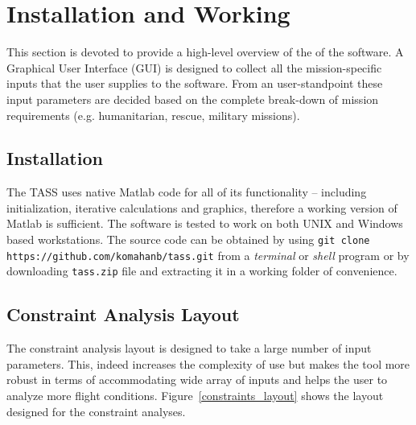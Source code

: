 \documentclass[pdftex,11pt,letter]{article}
\begin{document}
\section{Installation and Working }\label{layout}
This section is devoted to provide a high-level overview of the of the software. A Graphical User Interface (GUI) is designed to collect all the mission-specific inputs that the user supplies to the software. From an user-standpoint these input parameters are decided based on the complete break-down of mission requirements (e.g. humanitarian, rescue, military missions). 

\subsection{Installation}
The TASS uses native Matlab code for all of its functionality -- including initialization, iterative calculations and graphics, therefore a working version of Matlab\cite{MATLAB} is sufficient. The software is tested to work on both UNIX and Windows based workstations. The source code can be obtained by using \texttt{git clone https://github.com/komahanb/tass.git} from a \textit{terminal} or \textit{shell} program or by downloading \texttt{tass.zip} file and extracting it in a working folder of convenience. 


\subsection{Constraint Analysis Layout}
The constraint analysis layout is designed to take a large number of input parameters. This, indeed increases the complexity of use but makes the tool more robust in terms of accommodating wide array of inputs and helps the user to analyze more flight conditions.  Figure~\ref{constraints_layout} shows the layout designed for the constraint analyses.
\end{document}
